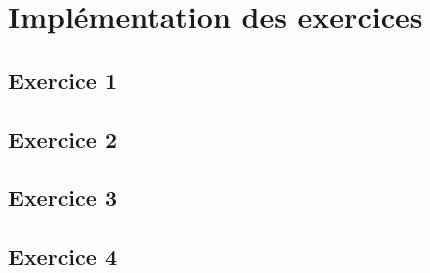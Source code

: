 \chapter{Implémentation des exercices}

\section{Exercice 1}


\pagebreak
\section{Exercice 2}


\section{Exercice 3}


\pagebreak
\section{Exercice 4}

